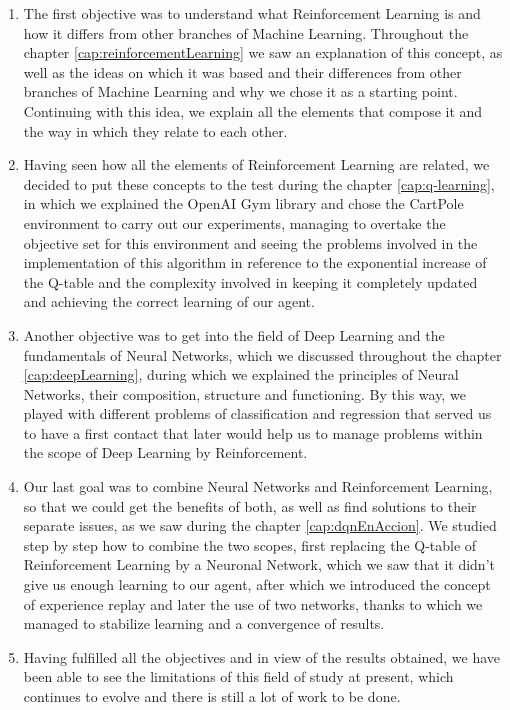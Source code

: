 \begin{enumerate}
        \item The first objective was to understand what Reinforcement Learning is and how it differs from other branches of Machine Learning. Throughout the chapter \ref{cap:reinforcementLearning} we saw an explanation of this concept, as well as the ideas on which it was based and their differences from other branches of Machine Learning and why we chose it as a starting point. Continuing with this idea, we explain all the elements that compose it and the way in which they relate to each other.
        \item Having seen how all the elements of Reinforcement Learning are related, we decided to put these concepts to the test during the chapter \ref{cap:q-learning}, in which we explained the OpenAI Gym library and chose the CartPole environment to carry out our experiments, managing to overtake the objective set for this environment and seeing the problems involved in the implementation of this algorithm in reference to the exponential increase of the Q-table and the complexity involved in keeping it completely updated and achieving the correct learning of our agent.
        \item Another objective was to get into the field of Deep Learning and the fundamentals of Neural Networks, which we discussed throughout the chapter \ref{cap:deepLearning}, during which we explained the principles of Neural Networks, their composition, structure and functioning. By this way, we played with different problems of classification and regression that served us to have a first contact that later would help us to manage problems within the scope of Deep Learning by Reinforcement.
        \item Our last goal was to combine Neural Networks and Reinforcement Learning, so that we could get the benefits of both, as well as find solutions to their separate issues, as we saw during the chapter \ref{cap:dqnEnAccion}. We studied step by step how to combine the two scopes, first replacing the Q-table of Reinforcement Learning by a Neuronal Network, which we saw that it didn't give us enough learning to our agent, after which we introduced the concept of experience replay and later the use of two networks, thanks to which we managed to stabilize learning and a convergence of results.
        \item Having fulfilled all the objectives and in view of the results obtained, we have been able to see the limitations of this field of study at present, which continues to evolve and there is still a lot of work to be done.
\end{enumerate}

